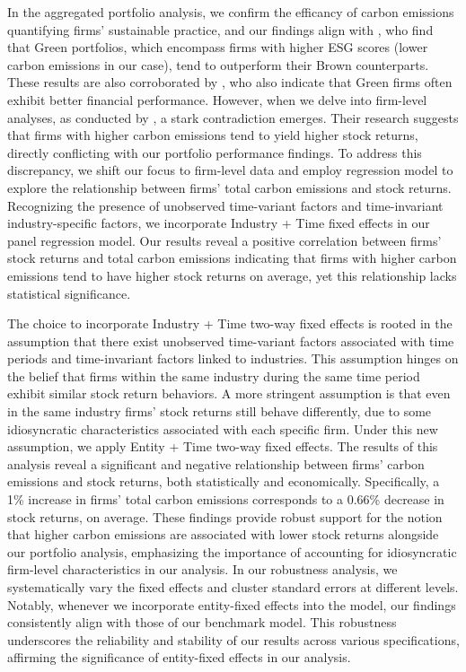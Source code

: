 \documentclass[12pt]{article}
\begin{document}
In the aggregated portfolio analysis, we confirm the efficancy of carbon emissions quantifying firms' sustainable practice, and our findings align with \cite{pastor2022dissecting}, who find that Green portfolios, which encompass firms with higher ESG scores (lower carbon emissions in our case), tend to outperform their Brown counterparts. These results are also corroborated by \cite{friede2015esg}, who also indicate that Green firms often exhibit better financial performance. However, when we delve into firm-level analyses, as conducted by \cite{bolton2021investors}, a stark contradiction emerges. Their research suggests that firms with higher carbon emissions tend to yield higher stock returns, directly conflicting with our portfolio performance findings. To address this discrepancy, we shift our focus to firm-level data and employ regression model to explore the relationship between firms' total carbon emissions and stock returns. Recognizing the presence of unobserved time-variant factors and time-invariant industry-specific factors, we incorporate Industry + Time fixed effects in our panel regression model. Our results reveal a positive correlation between firms' stock returns and total carbon emissions indicating that firms with higher carbon emissions tend to have higher stock returns on average, yet this relationship lacks statistical significance. 

The choice to incorporate Industry + Time two-way fixed effects is rooted in the assumption that there exist unobserved time-variant factors associated with time periods and time-invariant factors linked to industries. This assumption hinges on the belief that firms within the same industry during the same time period exhibit similar stock return behaviors. A more stringent assumption is that even in the same industry firms' stock returns still behave differently, due to some idiosyncratic characteristics associated with each specific firm. Under this new assumption, we apply Entity + Time two-way fixed effects. The results of this analysis reveal a significant and negative relationship between firms' carbon emissions and stock returns, both statistically and economically. Specifically, a 1\% increase in firms' total carbon emissions corresponds to a 0.66\% decrease in stock returns, on average. These findings provide robust support for the notion that higher carbon emissions are associated with lower stock returns alongside our portfolio analysis, emphasizing the importance of accounting for idiosyncratic firm-level characteristics in our analysis. In our robustness analysis, we systematically vary the fixed effects and cluster standard errors at different levels. Notably, whenever we incorporate entity-fixed effects into the model, our findings consistently align with those of our benchmark model. This robustness underscores the reliability and stability of our results across various specifications, affirming the significance of entity-fixed effects in our analysis.
\end{document}
